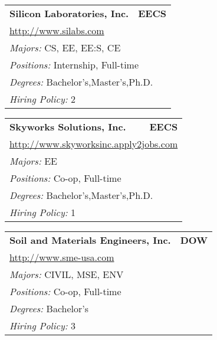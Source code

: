 \documentclass[twoside]{article}
\begin{document}
\begin{center}
\begin{multicols}{3}
\begin{FlushLeft}
\begin{minipage}{.9\columnwidth}
\end{minipage}
 
\begin{minipage}{.9\columnwidth}\begin{tabularx}{.95\columnwidth}{Xr}
                 {\Large\bf Silicon Laboratories, Inc.} & {\Large\bf EECS}\\
    \multicolumn{2}{p{.95\columnwidth}}{\url{http://www.silabs.com}}\\
    \multicolumn{2}{p{.95\columnwidth}}{\emph{Majors:} CS, EE, EE:S, CE}\\
    \multicolumn{2}{p{.95\columnwidth}}{\emph{Positions:} Internship, Full-time}\\
    \multicolumn{2}{p{.95\columnwidth}}{\emph{Degrees:} Bachelor's,Master's,Ph.D.}\\
    \multicolumn{2}{p{.95\columnwidth}}{\emph{Hiring Policy:} 2}\\
    \end{tabularx}
    
\end{minipage}
 
\begin{minipage}{.9\columnwidth}\begin{tabularx}{.95\columnwidth}{Xr}
                 {\Large\bf Skyworks Solutions, Inc.} & {\Large\bf EECS}\\
    \multicolumn{2}{p{.95\columnwidth}}{\url{http://www.skyworksinc.apply2jobs.com}}\\
    \multicolumn{2}{p{.95\columnwidth}}{\emph{Majors:} EE}\\
    \multicolumn{2}{p{.95\columnwidth}}{\emph{Positions:} Co-op, Full-time}\\
    \multicolumn{2}{p{.95\columnwidth}}{\emph{Degrees:} Bachelor's,Master's,Ph.D.}\\
    \multicolumn{2}{p{.95\columnwidth}}{\emph{Hiring Policy:} 1}\\
    \end{tabularx}
    
\end{minipage}
 
\begin{minipage}{.9\columnwidth}\begin{tabularx}{.95\columnwidth}{Xr}
                 {\Large\bf Soil and Materials Engineers, Inc.} & {\Large\bf DOW}\\
    \multicolumn{2}{p{.95\columnwidth}}{\url{http://www.sme-usa.com}}\\
    \multicolumn{2}{p{.95\columnwidth}}{\emph{Majors:} CIVIL, MSE, ENV}\\
    \multicolumn{2}{p{.95\columnwidth}}{\emph{Positions:} Co-op, Full-time}\\
    \multicolumn{2}{p{.95\columnwidth}}{\emph{Degrees:} Bachelor's}\\
    \multicolumn{2}{p{.95\columnwidth}}{\emph{Hiring Policy:} 3}\\
    \end{tabularx}
    

\end{minipage}
\end{FlushLeft}
\end{multicols}
\end{center}
\end{document}
